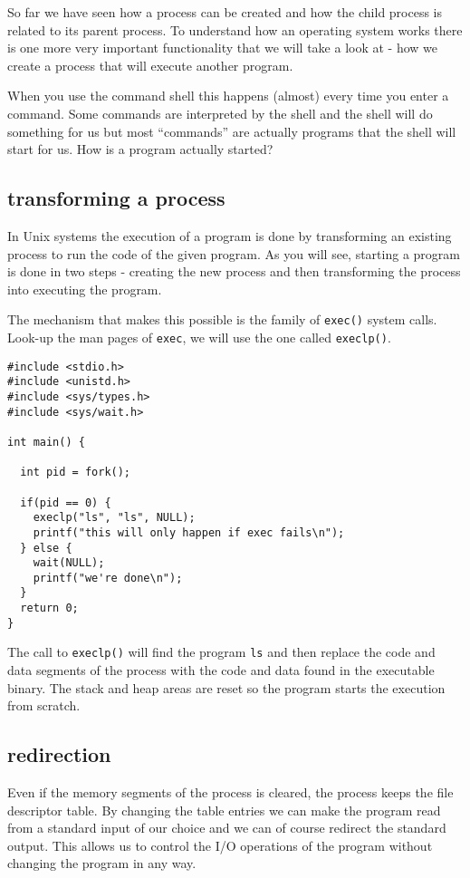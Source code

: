 \documentclass[a4paper,11pt]{article}
\begin{document}
So far we have seen how a process can be created and how the child
process is related to its parent process. To understand how an
operating system works there is one more very important functionality
that we will take a look at - how we create a process that will
execute another program.

When you use the command shell this happens (almost) every time you
enter a command. Some commands are interpreted by the shell and the
shell will do something for us but most ``commands'' are actually
programs that the shell will start for us. How is a program actually
started?

\subsection{transforming a process}

In Unix systems the execution of a program is done by transforming an
existing process to run the code of the given program. As you will
see, starting a program is done in two steps - creating the new
process and then transforming the process into executing the program.

The mechanism that makes this possible is the family of {\tt exec()}
system calls. Look-up the man pages of {\tt exec}, we will use the one
called {\tt execlp()}. 

\begin{lstlisting}
#include <stdio.h>
#include <unistd.h>
#include <sys/types.h>
#include <sys/wait.h>

int main() {

  int pid = fork();

  if(pid == 0) {
    execlp("ls", "ls", NULL);
    printf("this will only happen if exec fails\n");
  } else {
    wait(NULL);
    printf("we're done\n");
  }
  return 0;
}
\end{lstlisting}

The call to {\tt execlp()} will find the program {\tt ls} and then
replace the code and data segments of the process with the code and
data found in the executable binary. The stack and heap areas are
reset so the program starts the execution from scratch. 

\subsection{redirection}

Even if the memory segments of the process is cleared, the process
keeps the file descriptor table.  By changing the table entries we can
make the program read from a standard input of our choice and we can
of course redirect the standard output. This allows us to control the
I/O operations of the program without changing the program in any way.
\end{document}
